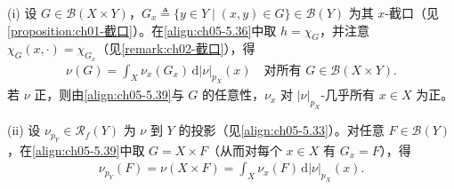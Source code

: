 \documentclass[../../main.tex]{subfiles}%
\begin{document}
\begin{remark}\label{remark:ch05-离散分解注}
(i) 设 $G\in\mathscr{B}(X\times Y)$，$G_x\triangleq \{y\in Y\mid(x,y)\in G\}\in\mathscr{B}(Y)$ 为其 $x$-截口（见\cref{proposition:ch01-截口}）。在\eqref{align:ch05-5.36}中取 $h=\chi_G$，并注意 $\chi_G(x,\cdot)=\chi_{G_x}$（见\cref{remark:ch02-截口}），得
\begin{align}
\nu(G)=\int_X\nu_x(G_x)\,\mathrm{d}|\nu|_{p_X}(x)
\quad\text{对所有 }G\in\mathscr{B}(X\times Y).\label{align:ch05-5.39}
\end{align}
若 $\nu$ 正，则由\eqref{align:ch05-5.39}与 $G$ 的任意性，$\nu_x$ 对 $|\nu|_{p_X}$-几乎所有 $x\in X$ 为正。

(ii) 设 $\nu_{p_Y}\in\mathscr{R}_f(Y)$ 为 $\nu$ 到 $Y$ 的投影（见\eqref{align:ch05-5.33}）。对任意 $F\in\mathscr{B}(Y)$，在\eqref{align:ch05-5.39}中取 $G=X\times F$（从而对每个 $x\in X$ 有 $G_x=F$），得
\begin{align}
\nu_{p_Y}(F)=\nu(X\times F)=\int_X\nu_x(F)\,\mathrm{d}|\nu|_{p_X}(x).\label{align:ch05-5.40}
\end{align}
\end{remark}
\end{document}
